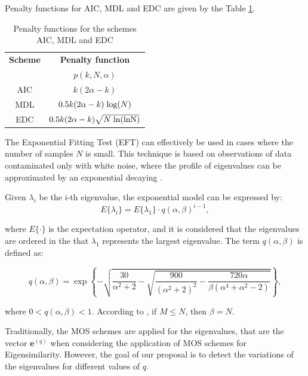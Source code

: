 Penalty functions for AIC, MDL and EDC are given by the Table \ref{tab:mos_penalty_functions}.

\begin{table}[h!]
  \centering
  \caption{Penalty functions for the schemes AIC, MDL and EDC}
  \label{tab:mos_penalty_functions}
  \begin{tabular}{*2c}
	\toprule
	\textbf{Scheme} &  \textbf{Penalty function} \\
	\textbf{} &  $p(k,N,\alpha)$ \\
	\midrule
    AIC	& $k(2\alpha - k)$ \\
    MDL	& $0.5k(2\alpha - k) \hspace{1 mm} {\rm log} (N)$ \\
    EDC	& $0.5k(2\alpha - k)\sqrt{N\hspace{1 mm}\rm ln(\rm ln N)}$ \\
    \bottomrule
  \end{tabular}
\end{table}

The Exponential Fitting Test (EFT) can effectively be used in cases where the number of samples $N$ is small. This technique is based on observations of data contaminated only with white noise, where the profile of eigenvalues can be approximated by an exponential decaying \cite{grouffaud1996some}.

Given $\lambda_i$ be the i-th eigenvalue, the exponential model can be expressed by:
\begin{equation}\label{eq:eq3}
  E\{\lambda_i\} = E\{\lambda_1\} \cdot q(\alpha,\beta)^{i-1},
\end{equation}

where $E\{\cdot\} $ is the expectation operator, and it is considered that the eigenvalues are ordered in the that $\lambda_1$ represents the largest eigenvalue. The term $q(\alpha, \beta)$ is defined as:

\begin{equation}\label{eq:eq4}
  q(\alpha,\beta) = \exp\left\{-\sqrt{\frac{30}{\alpha^2 + 2} - \sqrt{\frac{900}{(\alpha^2 + 2)^2} - \frac{720\alpha}{\beta(\alpha^4 + \alpha^2 - 2)}}} \right\},
\end{equation}

where $0 < q(\alpha,\beta) < 1$. According to \cite{quinlan2006model}, if $M \leq N$, then $\beta = N$.

Traditionally, the MOS schemes are applied for the eigenvalues, that are the vector $\pmb{e}^{(q)}$ when considering the application of MOS schemes for Eigensimilarity. However, the goal of our proposal is to detect the variations of the eigenvalues for different values of $q$. 

